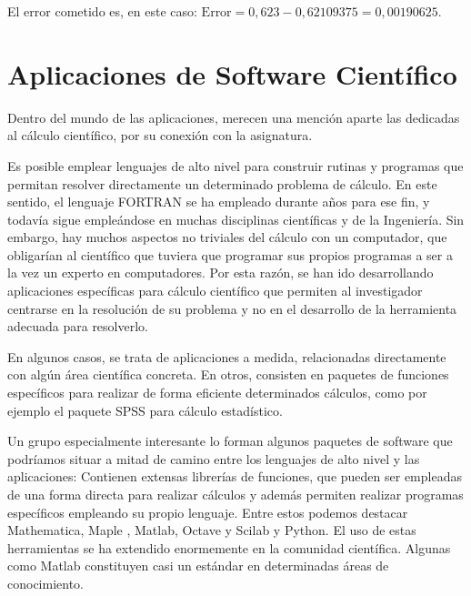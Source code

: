 El error cometido es, en este caso: $\text{Error}=0,623-0,62109375=0,00190625$.
  
 \section{Aplicaciones de Software Científico}
Dentro del mundo de las aplicaciones, merecen una mención aparte las dedicadas al cálculo científico, por su conexión con la asignatura. 

Es posible emplear lenguajes de alto nivel para construir rutinas y programas que permitan resolver directamente un determinado problema de cálculo. En este sentido, el lenguaje FORTRAN se ha empleado durante años para ese fin, y todavía sigue empleándose en muchas disciplinas científicas y de la Ingeniería.  Sin embargo, hay muchos aspectos no triviales del cálculo con un computador, que obligarían al científico que tuviera que programar sus propios programas a ser a la vez un experto en computadores.  Por esta razón, se han ido desarrollando aplicaciones específicas para cálculo científico que permiten al investigador centrarse en la resolución de su problema y no en el desarrollo de la herramienta adecuada para resolverlo.  
 
En algunos casos, se trata de aplicaciones a medida, relacionadas directamente con algún área científica concreta. En otros, consisten en paquetes de funciones específicos para realizar de forma eficiente determinados cálculos, como por ejemplo
el paquete SPSS para cálculo estadístico.

Un grupo especialmente interesante lo forman algunos paquetes de software que podríamos situar a mitad de camino entre los lenguajes de alto nivel y las aplicaciones: Contienen extensas librerías de funciones, que pueden ser empleadas de una forma directa para realizar cálculos y además permiten realizar programas específicos empleando su propio lenguaje. Entre estos podemos destacar Mathematica, Maple , Matlab, Octave y Scilab y Python. El uso de estas herramientas se ha extendido enormemente en la comunidad científica. Algunas como Matlab  constituyen casi un estándar en determinadas áreas de conocimiento.
